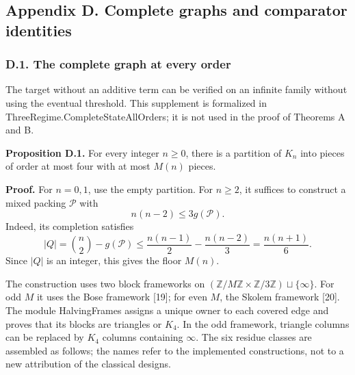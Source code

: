 \documentclass[english,11pt,a4paper]{article}
\begin{document}
\subsection{Appendix D. Complete graphs and comparator identities}\label{appendix-d.-complete-graphs-and-comparator-identities}

\subsubsection{D.1. The complete graph at every order}\label{d.1.-the-complete-graph-at-every-order}

The target without an additive term can be verified on an infinite family without using the eventual threshold. This supplement is formalized in {\ttfamily\small ThreeRegime.\discretionary{\hbox{\ensuremath{\hookrightarrow}}}{}{}CompleteStat\discretionary{\hbox{\ensuremath{\hookrightarrow}}}{}{}eAllOrders}; it is not used in the proof of Theorems A and B.

\textbf{Proposition D.1.} For every integer \(n\ge0\), there is a partition of \(K_n\) into pieces of order at most four with at most \(M(n)\) pieces.

\textbf{Proof.} For \(n=0,1\), use the empty partition. For \(n\ge2\), it suffices to construct a mixed packing \(\mathcal P\) with \[
n(n-2)\le3g(\mathcal P).
\tag{D.1}
\] Indeed, its completion satisfies \[
|Q|=\binom n2-g(\mathcal P)
\le\frac{n(n-1)}2-\frac{n(n-2)}3
=\frac{n(n+1)}6.
\tag{D.2}
\] Since \(|Q|\) is an integer, this gives the floor \(M(n)\).

The construction uses two block frameworks on \((\mathbb Z/M\mathbb Z\times\mathbb Z/3\mathbb Z)\sqcup\{\infty\}\). For odd \(M\) it uses the Bose framework {[}19{]}; for even \(M\), the Skolem framework {[}20{]}. The module {\ttfamily\small HalvingFrame\discretionary{\hbox{\ensuremath{\hookrightarrow}}}{}{}s} assigns a unique owner to each covered edge and proves that its blocks are triangles or \(K_4\). In the odd framework, triangle columns can be replaced by \(K_4\) columns containing \(\infty\). The six residue classes are assembled as follows; the names refer to the implemented constructions, not to a new attribution of the classical designs.

\end{document}
